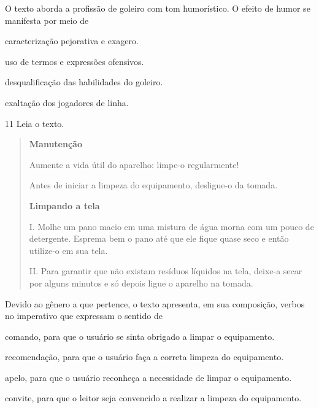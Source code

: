 O texto aborda a profissão de goleiro com tom humorístico. O efeito de
humor se manifesta por meio de

\begin{escolha}
\item caracterização pejorativa e exagero.

\item uso de termos e expressões ofensivos.

\item desqualificação das habilidades do goleiro.

\item exaltação dos jogadores de linha.
\end{escolha}

\num{11} Leia o texto.

\begin{quote}
\textbf{Manutenção}

Aumente a vida útil do aparelho: limpe-o regularmente!

Antes de iniciar a limpeza do equipamento, desligue-o da tomada.


\textbf{Limpando a tela}

I. Molhe um pano macio em uma mistura de água morna com um pouco de
detergente. Esprema bem o pano até que ele fique quase seco e então
utilize-o em sua tela.

II. Para garantir que não existam resíduos líquidos na tela, deixe-a
secar por alguns minutos e só depois ligue o aparelho na tomada.

\end{quote}

Devido ao gênero a que pertence, o texto apresenta, em sua composição,
verbos no imperativo que expressam o sentido de

\begin{escolha}
\item comando, para que o usuário se sinta obrigado a limpar o equipamento.

\item recomendação, para que o usuário faça a correta limpeza do
equipamento.

\item apelo, para que o usuário reconheça a necessidade de limpar o
equipamento.

\item convite, para que o leitor seja convencido a realizar a limpeza do
equipamento.
\end{escolha}

